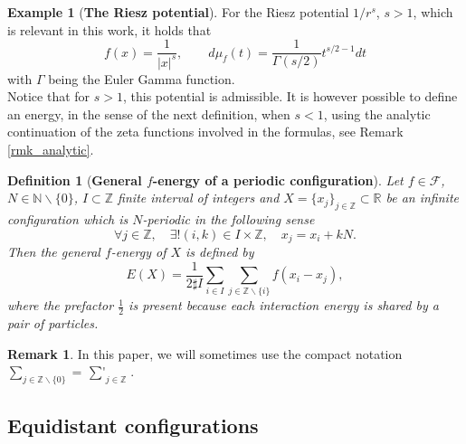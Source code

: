 \documentclass[12pt]{iopart}
\def\xsum{\mathop{\sum\nolimits'}}
\newtheorem{defi}{Definition}[section]
\theoremstyle{definition}
\newtheorem{remark}[thm]{Remark}
\newtheorem{example}[thm]{Example}
\newcommand{\R}{\mathbb R}
\newcommand{\Z}{\mathbb Z}
\newcommand{\N}{\mathbb N}
\begin{document}
\begin{example}[\textbf{The Riesz potential}]
For the Riesz potential $1/r^s$, $s>1$, which is relevant in this work,
it holds that
\begin{equation} 
f(x) = \frac{1}{\vert x\vert^s} , \qquad  d\mu_f(t)
= \frac{1}{\Gamma(s/2)} t^{s/2-1} dt  
\end{equation}
with $\Gamma$ being the Euler Gamma function.\\
Notice that for $s>1$, this potential is admissible. It is however possible to define an energy, in the sense of the next definition, when $s<1$, using the analytic continuation of the zeta functions involved in the formulas, see Remark \ref{rmk_analytic}.
\end{example}
\begin{defi}[\textbf{General $f$-energy of a periodic configuration}]
Let $f\in \mathcal{F}$, $N\in \N\backslash \{0\}$, $I\subset \Z$ finite interval of
integers and $X=\{x_j\}_{j\in \Z}\subset \R$ be an infinite configuration
which is $N$-periodic in the following sense
$$
\forall j\in \Z, \quad \exists ! (i,k)\in I\times \Z,\quad x_j=x_i+k N .
$$
Then the general $f$-energy of $X$ is defined by
$$
E(X)=\frac{1}{2\sharp I}\sum_{i\in I} \sum_{j\in \Z\backslash \{i\}} f(x_i-x_j),
$$
where the prefactor $\frac{1}{2}$ is present because each interaction energy
is shared by a pair of particles.
\end{defi}

\begin{remark}
In this paper, we will sometimes use the compact notation $\displaystyle \sum_{j\in \Z\backslash \{0\}}=\displaystyle \xsum_{j\in \Z}$.
\end{remark}

\subsection{Equidistant configurations} \label{Sec21}
\end{document}
